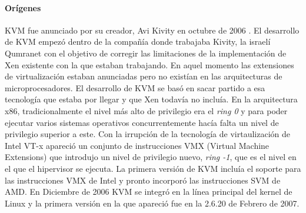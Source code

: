 \paragraph{Orígenes}
KVM fue anunciado por su creador, Avi Kivity en octubre de 2006 \cite{kvm_2}. El desarrollo de KVM empezó dentro de la compañía donde trabajaba Kivity, la israelí Qumranet con el objetivo de corregir las limitaciones de la implementación de Xen existente con la que estaban trabajando. En aquel momento las extensiones de virtualización estaban anunciadas pero no existían en las arquitecturas de microprocesadores. El desarrollo de KVM se basó en sacar partido a esa tecnología que estaba por llegar y que Xen todavía no incluía. En la arquitectura x86, tradicionalmente el nivel más alto de privilegio era el \textit{ring 0} y para poder ejecutar varios sistemas operativos concurrentemente hacía falta un nivel de privilegio superior a este. Con la irrupción de la tecnología de virtaulización de Intel VT-x apareció un conjunto de instrucciones VMX (Virtual Machine Extensions) que introdujo un nivel de privilegio nuevo, \textit{ring -1}, que es el nivel en el que el hipervisor se ejecuta. La primera versión de KVM incluía el soporte para las instrucciones VMX de Intel y pronto incorporó las instrucciones SVM de AMD. En Diciembre de 2006 KVM se integró en la línea principal del kernel de Linux y la primera versión en la que apareció fue en la 2.6.20 de Febrero de 2007.

